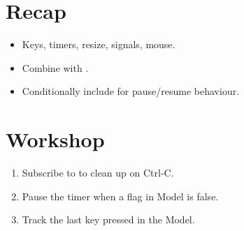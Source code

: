\section{Recap}

\begin{recap}
\begin{itemize}[leftmargin=*]
  \item Keys, timers, resize, signals, mouse.
  \item Combine with .
  \item Conditionally include for pause/resume behaviour.
\end{itemize}
\end{recap}

\section*{Workshop}

\begin{enumerate}[leftmargin=*]
  \item Subscribe to  to clean up on Ctrl-C.
  \item Pause the timer when a flag in Model is false.
  \item Track the last key pressed in the Model.
\end{enumerate}
